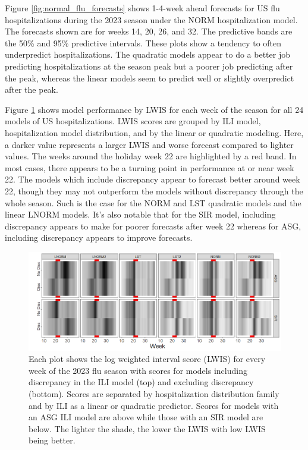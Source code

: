\documentclass[ba]{imsart}
\theoremstyle{plain}
\theoremstyle{definition}
\theoremstyle{remark}
\begin{document}
Figure \ref{fig:normal_flu_forecasts} shows 1-4-week ahead forecasts for US flu hospitalizations during the 2023 season under the NORM hospitalization model. The forecasts shown are for weeks 14, 20, 26, and 32. The predictive bands are the 50\% and 95\% predictive intervals.
These plots show a tendency to often underpredict hospitalizations. The quadratic models appear to do a better job predicting  hospitalizations at the season peak but a poorer job predicting after the peak, whereas the linear models seem to predict well or slightly overpredict after the peak. 

Figure \ref{fig:us_lwis} shows model performance by LWIS for each week of the season for all 24 models of US hospitalizations. LWIS scores are grouped by ILI model, hospitalization model distribution, and by the linear or quadratic modeling. Here, a darker value represents a larger LWIS and worse forecast compared to lighter values. The weeks around the holiday week 22 are highlighted by a red band. In most cases, there appears to be a turning point in performance at or near week 22. The models which include discrepancy appear to forecast better around week 22, though they may not outperform the models without discrepancy through the whole season. 
Such is the case for the NORM and LST quadratic models and the linear LNORM models. It's also notable that for the SIR model, including discrepancy appears to make for poorer forecasts after week 22 whereas for ASG, including discrepancy appears to improve forecasts.



\begin{figure}
    
    \includegraphics[scale = .5]{Images/lwis_us_full_season.png}
    \caption{Each plot shows the log weighted interval score (LWIS) for every week of the 2023 flu season with scores for models including discrepancy in the ILI model (top) and excluding discrepancy (bottom). Scores are separated by hospitalization distribution family and by ILI as a linear or quadratic predictor. Scores for models with an ASG ILI model are above while those with an SIR model are below. The lighter the shade, the lower the LWIS with low LWIS being better.}
    \label{fig:us_lwis}
\end{figure}
\end{document}
